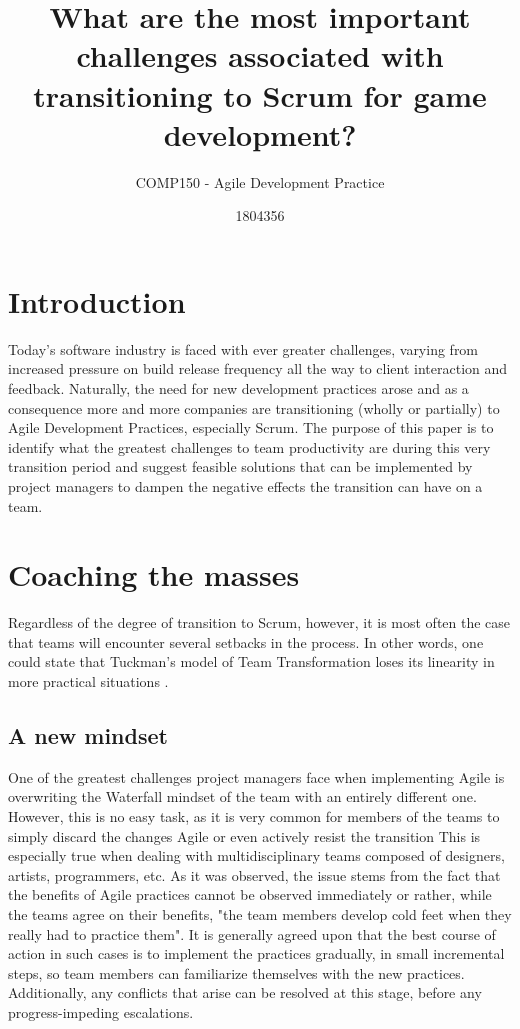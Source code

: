 \documentclass{scrartcl}
\title{What are the most important challenges associated with transitioning to Scrum for game development?}
\subtitle{COMP150 - Agile Development Practice}
\author{1804356}
\begin{document}
\maketitle


\section{Introduction}

  Today's software industry is faced with ever greater challenges, varying from increased pressure on build release frequency all the way to client interaction and feedback. Naturally, the need for new development practices arose and as a consequence more and more companies are transitioning (wholly or partially) to Agile Development Practices, especially Scrum. The purpose of this paper is to identify what the greatest challenges to team productivity are during this very transition period and suggest feasible solutions that can be implemented by project managers to dampen the negative effects the transition can have on a team.
  
 
    \section{Coaching the masses}
    
    
     Regardless of the degree of transition to Scrum, however, it is most often the case that teams will encounter several setbacks in the process. In other words, one could state that Tuckman's model of Team Transformation loses its linearity in more practical situations \cite{4599458}. 
     
    \subsection{A new mindset}
    
    One of the greatest challenges project managers face when implementing Agile is overwriting the Waterfall mindset of the team with an entirely different one. However, this is no easy task, as it is very common for members of the teams to simply discard the changes Agile or even actively resist the transition \cite{MtnGoat} This is especially true when dealing with multidisciplinary teams composed of designers, artists, programmers, etc. As it was observed, the issue stems from the fact that the benefits of Agile practices cannot be observed immediately or rather, while the teams agree on their benefits, "the team members develop cold feet when they really had to practice them"\cite{4599456}. It is generally agreed upon that the best course of action in such cases is to implement the practices gradually, in small incremental steps, so team members can familiarize themselves with the new practices\cite{4293601, 4599458}. Additionally, any conflicts that arise can be resolved at this stage, before any progress-impeding escalations.
    
\end{document}
